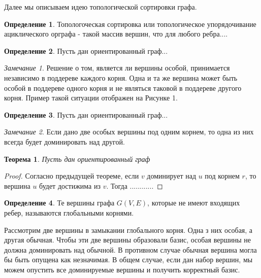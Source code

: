 \documentclass[12pt,a4paper,oneside]{article}
\newtheorem{theorem}{Теорема}
\theoremstyle{definition}
\newtheorem{definition}{Определение}[]
\theoremstyle{lemma}
\theoremstyle{remark}
\newtheorem{remark}{Замечание}[]
\begin{document}
Далее мы описываем идею топологической сортировки графа.

\begin{definition}
Топологоческая сортировка или топологическое упорядочивание ациклического орграфа - такой массив вершин, что для любого ребра....
\end{definition}

\begin{definition}
Пусть дан ориентированный граф...
\end{definition}

\begin{remark}
Решение о том, является ли вершины особой, принимается независимо в поддереве каждого корня. Одна и та же вершина может быть особой в поддереве одного корня и не являться таковой в поддереве другого корня. Пример такой ситуации отображен на Рисунке 1.
\end{remark}

\begin{definition}
Пусть дан ориентированный граф...
\end{definition}

\begin{remark}
Если дано две особых вершины под одним корнем, то одна из них всегда будет доминировать над другой.
\end{remark}

\begin{theorem}
Пусть дан ориентированный граф
\end{theorem}
\begin{proof}
Согласно предыдущей теореме, если $v$ доминирует над $u$ под корнем $r$, то вершина $u$ будет достижима из $v$. Тогда ............
\end{proof}


\begin{definition}
Те вершины графа $G(V,E)$, которые не имеют входящих ребер, называются глобальными корнями.
\end{definition}

Рассмотрим две вершины в замыкании глобального корня. Одна з них особая, а другая обычная. Чтобы эти две вершины образовали базис, особая вершины не должна доминировать над обычной. В противном случае обычная вершина могла бы быть опущена как незначимая. В общем случае, если дан набор вершин, мы можем опустить все доминируемые вершины и получить корректный базис.
\end{document}
